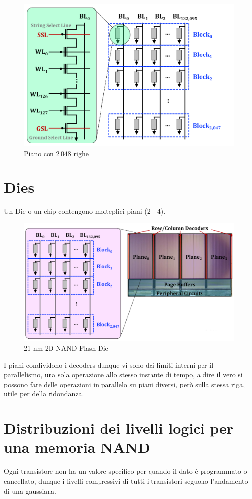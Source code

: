 \begin{figure}[htbp]
    \centering
    \includegraphics[width=0.65\linewidth]{img/mhg.png}
    \caption{Piano con $2\,048$ righe}
\end{figure}

\section{Dies}

Un Die o un chip contengono molteplici piani (2 - 4).

\begin{figure}[htbp]
    \centering
    \includegraphics[width=0.65\linewidth]{img/dbsf.png}
    \caption{21-nm 2D NAND Flash Die}
\end{figure}

I piani condividono i decoders dunque vi sono dei limiti interni per il parallelismo, una sola operazione allo stesso instante di tempo, a dire il vero si possono fare delle operazioni in parallelo su piani diversi, però sulla stessa riga, utile per della ridondanza.

\newpage
\section{Distribuzioni dei livelli logici per una memoria NAND}

Ogni transistore non ha un valore specifico per quando il dato è programmato o cancellato, dunque i livelli compressivi di tutti i transistori seguono l'andamento di una gaussiana.

